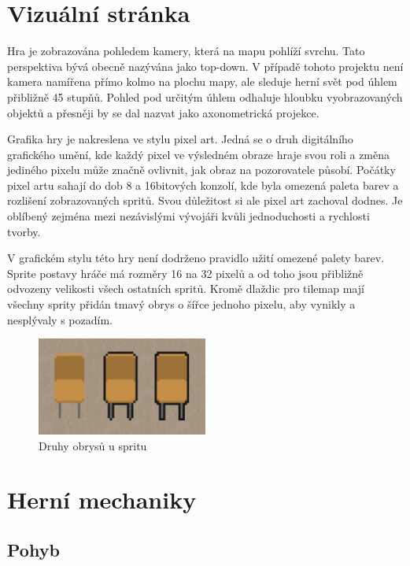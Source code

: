 \documentclass[FM,Proj]{tulthesis}
\begin{document}
	\section{Vizuální stránka}
	
	Hra je zobrazována pohledem kamery, která na mapu pohlíží svrchu. Tato perspektiva bývá obecně nazývána jako top-down. V případě tohoto projektu není kamera namířena přímo kolmo na plochu mapy, ale sleduje herní svět pod úhlem přibližně 45 stupňů. Pohled pod určitým úhlem odhaluje hloubku vyobrazovaných objektů a přesněji by se dal nazvat jako axonometrická projekce.
	\cite{MatejJan}
	
	Grafika hry je nakreslena ve stylu pixel art. Jedná se o druh digitálního grafického umění, kde každý pixel ve výsledném obraze hraje svou roli a změna jediného pixelu může značně ovlivnit, jak obraz na pozorovatele působí. Počátky pixel artu sahají do dob 8 a 16bitových konzolí, kde byla omezená paleta barev a rozlišení zobrazovaných spritů. Svou důležitost si ale pixel art zachoval dodnes. Je oblíbený zejména mezi nezávislými vývojáři kvůli jednoduchosti a rychlosti tvorby.
	\cite{pixelArt}
	
	V grafickém stylu této hry není dodrženo pravidlo užití omezené palety barev. Sprite postavy hráče má rozměry 16 na 32 pixelů a od toho jsou přibližně odvozeny velikosti všech ostatních spritů. Kromě dlaždic pro tilemap mají všechny sprity přidán tmavý obrys o šířce jednoho pixelu, aby vynikly a nesplývaly s pozadím.
	
	\begin{figure}[ht]
		\centering
		\includegraphics[width=0.5\textwidth]{img/SpriteBorder}
		\caption{Druhy obrysů u spritu}
	\end{figure}
	
	\section{Herní mechaniky}
	
	\subsection{Pohyb} %
	
\end{document}
